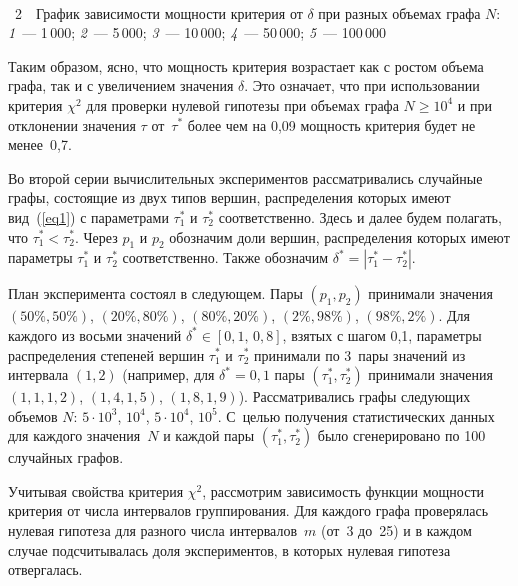 \begin{multicols}{2}


\begin{center} %
\vspace*{-1pt}
\mbox{%
\epsfxsize=79.389mm
}
\vspace*{6pt}
\end{center}
{{\figurename~2}\ \ \small{График зависимости мощности критерия
от $\delta$ при разных объемах графа $N$:
\textit{1}~--- 1\,000; \textit{2}~--- 5\,000; \textit{3}~--- 10\,000;
\textit{4}~--- 50\,000; \textit{5}~--- 100\,000}}
\vspace*{18pt}




Таким образом, ясно, что мощность критерия возрастает
как с ростом объема графа, так и с увеличением значения $\delta$.
Это означает, что при использовании критерия $\chi^2$ для проверки
нулевой гипотезы при объемах графа $N\geqslant 10^4$ и при отклонении
значения $\tau$ от~$\tau^*$ более чем на 0,09 мощность критерия
будет не менее~0,7.

Во второй серии вычислительных экспериментов рассматривались
случайные графы, состоящие из двух типов вершин, распределения
которых имеют вид~(\ref{eq1}) с параметрами $\tau_1^*$ и
$\tau_2^*$ соответственно. Здесь и далее будем полагать, что
$\tau_1^*<\tau_2^*$. Через $p_1$ и $p_2$ обозначим доли вершин,
распределения которых имеют параметры $\tau_1^*$ и $\tau_2^*$
соответственно. Также обозначим $\delta^*=|\tau_1^*-\tau_2^*|$.

План эксперимента состоял в следующем. Пары $(p_1,p_2)$ принимали
значения $(50\%,50\%)$, $(20\%,80\%)$, $(80\%,20\%)$,
$(2\%,98\%)$, $(98\%,2\%)$. Для каждого из восьми значений
$\delta^*\in [0{,}1,\,0{,}8]$, взятых с шагом 0,1, параметры
распределения степеней вершин $\tau_1^*$ и $\tau_2^*$ принимали
по 3~пары значений из интервала $(1,2)$ (например, для
$\delta^*=0{,}1$ пары $(\tau_1^*,\tau_2^*)$ принимали значения
$(1{,}1, 1{,}2)$, $(1{,}4, 1{,}5)$, $(1{,}8, 1{,}9)$). Рассматривались графы
следующих объемов $N$: $5\cdot10^3$, $10^4$, $5\cdot10^4$,
$10^5$. С~целью получения статистических данных для каждого
значения~$N$ и каждой пары $(\tau_1^*,\tau_2^*)$ было
сгенерировано по 100 случайных графов.



Учитывая свойства критерия $\chi^2$, рассмотрим зависимость
функции мощности критерия от числа интервалов группирования. Для
каждого графа проверялась нулевая гипотеза для разного числа
интервалов~$m$ (от~3 до~25) и в каждом случае подсчитывалась
доля экспериментов, в которых нулевая гипотеза отвергалась.


\end{multicols}
